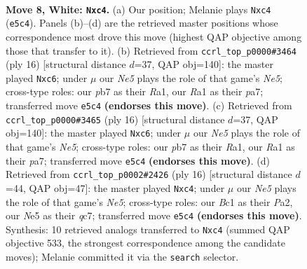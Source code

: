 \documentclass[11pt]{article}
\begin{document}
\begin{figure}[p]\centering
\begin{subfigure}{0.46\textwidth}\centering
\resizebox{\linewidth}{!}{%
\newchessgame
\chessboard[
  setfen={rnbq1rk1/ppp1bpp1/4pn2/4N2p/2pP4/6P1/PP2PPBP/RNBQ1RK1 w - - 0 8},
  showmover=false,
  pgfstyle=straightmove, color=movearrow, markmove={e5-c4}
]}
\caption{}
\end{subfigure}\hfill
\begin{subfigure}{0.46\textwidth}\centering
\resizebox{\linewidth}{!}{%
\newchessgame
\chessboard[
  setfen={r1bq1rk1/p1p1bppp/2p1pn2/4N3/2pP4/6P1/PP2PP1P/RNBQ1RK1 w - - 0 9},
  showmover=false,
  pgfstyle=straightmove, color=movearrow, markmove={e5-c6}
]}
\caption{}
\end{subfigure}
\\[4pt]
\begin{subfigure}{0.46\textwidth}\centering
\resizebox{\linewidth}{!}{%
\newchessgame
\chessboard[
  setfen={r1bq1rk1/p1p1bppp/2p1pn2/4N3/2pP4/6P1/PP2PP1P/RNBQ1RK1 w - - 0 9},
  showmover=false,
  pgfstyle=straightmove, color=movearrow, markmove={e5-c6}
]}
\caption{}
\end{subfigure}\hfill
\begin{subfigure}{0.46\textwidth}\centering
\resizebox{\linewidth}{!}{%
\newchessgame
\chessboard[
  setfen={rnb2rk1/ppq1bppp/4pn2/2P1N3/2p5/6P1/PP2PPBP/RNBQ1RK1 w - - 1 9},
  showmover=false,
  pgfstyle=straightmove, color=movearrow, markmove={e5-c4}
]}
\caption{}
\end{subfigure}
\caption{\textbf{Move 8, White: \texttt{Nxc4}.} (a) Our position; Melanie plays \texttt{Nxc4} (\texttt{e5c4}). Panels (b)--(d) are the retrieved master positions whose correspondence most drove this move (highest QAP objective among those that transfer to it). (b) Retrieved from \texttt{ccrl\_top\_p0000\#3464} (ply 16) [structural distance $d$=37, QAP obj=140]: the master played \texttt{Nxc6}; under $\mu$ our \emph{Ne5} plays the role of that game's \emph{Ne5}; cross-type roles: our \emph{p}b7 as their \emph{R}a1, our \emph{R}a1 as their \emph{p}a7; transferred move \texttt{e5c4} \textbf{(endorses this move)}. (c) Retrieved from \texttt{ccrl\_top\_p0000\#3465} (ply 16) [structural distance $d$=37, QAP obj=140]: the master played \texttt{Nxc6}; under $\mu$ our \emph{Ne5} plays the role of that game's \emph{Ne5}; cross-type roles: our \emph{p}b7 as their \emph{R}a1, our \emph{R}a1 as their \emph{p}a7; transferred move \texttt{e5c4} \textbf{(endorses this move)}. (d) Retrieved from \texttt{ccrl\_top\_p0002\#2426} (ply 16) [structural distance $d$=44, QAP obj=47]: the master played \texttt{Nxc4}; under $\mu$ our \emph{Ne5} plays the role of that game's \emph{Ne5}; cross-type roles: our \emph{B}c1 as their \emph{P}a2, our \emph{N}e5 as their \emph{q}c7; transferred move \texttt{e5c4} \textbf{(endorses this move)}. Synthesis: 10 retrieved analogs transferred to \texttt{Nxc4} (summed QAP objective 533, the strongest correspondence among the candidate moves); Melanie committed it via the \texttt{search} selector.}
\label{fig:thought-m14}
\end{figure}
\end{document}

